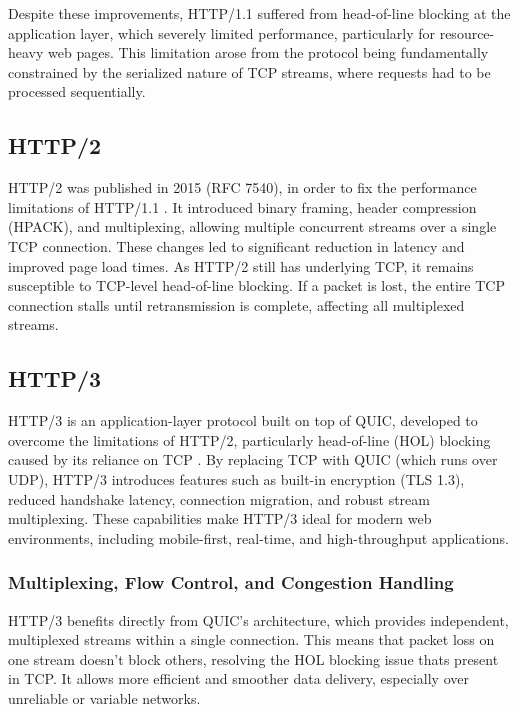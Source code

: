 Despite these improvements, HTTP/1.1 suffered from head-of-line blocking at the application layer, which severely limited performance, particularly for resource-heavy web pages. This limitation arose from the protocol being fundamentally constrained by the serialized nature of TCP streams, where requests had to be processed sequentially.

\subsection{HTTP/2}

HTTP/2 was published in 2015 (RFC 7540), in order to fix the performance limitations of HTTP/1.1 \cite{kurose2017}. It introduced binary framing, header compression (HPACK), and multiplexing, allowing multiple concurrent streams over a single TCP connection. These changes led to significant reduction in latency and improved page load times. As HTTP/2 still has underlying TCP, it remains susceptible to TCP-level head-of-line blocking. If a packet is lost, the entire TCP connection stalls until retransmission is complete, affecting all multiplexed streams.

\subsection{HTTP/3}

HTTP/3 is an application-layer protocol built on top of QUIC, developed to overcome the limitations of HTTP/2, particularly head-of-line (HOL) blocking caused by its reliance on TCP \cite{rfc9114} \cite{marx2021-http3}. By replacing TCP with QUIC (which runs over UDP), HTTP/3 introduces features such as built-in encryption (TLS 1.3), reduced handshake latency, connection migration, and robust stream multiplexing. These capabilities make HTTP/3 ideal for modern web environments, including mobile-first, real-time, and high-throughput applications.

\subsubsection{Multiplexing, Flow Control, and Congestion Handling}

HTTP/3 benefits directly from QUIC’s architecture, which provides independent, multiplexed streams within a single connection. This means that packet loss on one stream doesn’t block others, resolving the HOL blocking issue thats present in TCP. It allows more efficient and smoother data delivery, especially over unreliable or variable networks.

